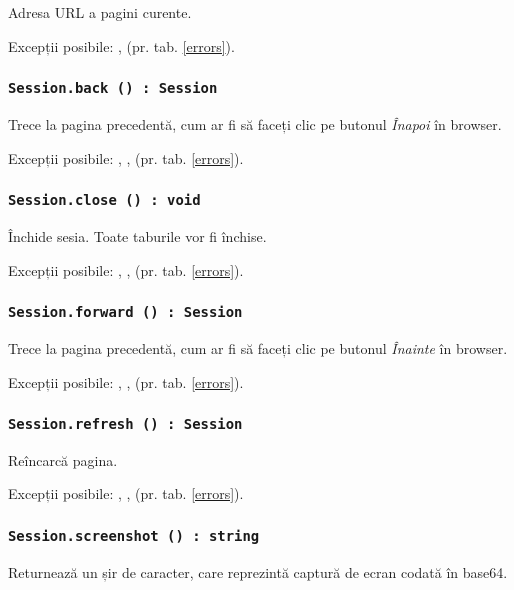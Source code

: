 Adresa URL a pagini curente.

Excepții posibile: ,  (pr. tab. \ref{errors}).

\subsubsection{\lstinline|Session.back () : Session|}

Trece la pagina precedentă, cum ar fi să faceți clic pe butonul \textit{Înapoi} în browser.

Excepții posibile: , ,  (pr. tab. \ref{errors}).

\subsubsection{\lstinline|Session.close () : void|}

Închide sesia. Toate taburile vor fi închise.

Excepții posibile: , ,  (pr. tab. \ref{errors}).

\subsubsection{\lstinline|Session.forward () : Session|}

Trece la pagina precedentă, cum ar fi să faceți clic pe butonul \textit{Înainte} în browser.

Excepții posibile: , ,  (pr. tab. \ref{errors}).

\subsubsection{\lstinline|Session.refresh () : Session|}

Reîncarcă pagina.

Excepții posibile: , ,  (pr. tab. \ref{errors}).

\subsubsection{\lstinline|Session.screenshot () : string|}

Returnează un șir de caracter, care reprezintă captură de ecran codată în base64.


